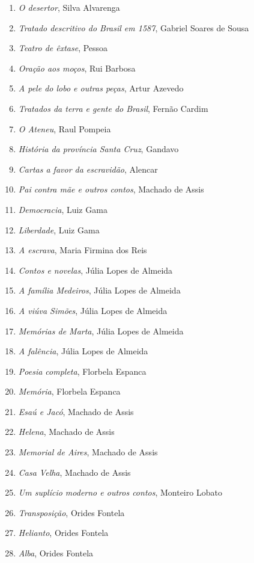 \begin{enumerate}
\setlength\parskip{4.2pt}
\setlength\itemsep{-1.4mm}
\item \textit{O desertor}, Silva Alvarenga
\item \textit{Tratado descritivo do Brasil em 1587}, Gabriel Soares de Sousa
\item \textit{Teatro de êxtase}, Pessoa
\item \textit{Oração aos moços}, Rui Barbosa
\item \textit{A pele do lobo e outras peças}, Artur Azevedo
\item \textit{Tratados da terra e gente do Brasil}, Fernão Cardim 
\item \textit{O Ateneu}, Raul Pompeia
\item \textit{História da província Santa Cruz}, Gandavo
\item \textit{Cartas a favor da escravidão}, Alencar
\item \textit{Pai contra mãe e outros contos}, Machado de Assis
\item \textit{Democracia}, Luiz Gama
\item \textit{Liberdade}, Luiz Gama
\item \textit{A escrava}, Maria Firmina dos Reis
\item \textit{Contos e novelas}, Júlia Lopes de Almeida 
\item \textit{A família Medeiros}, Júlia Lopes de Almeida
\item \textit{A viúva Simões}, Júlia Lopes de Almeida
\item \textit{Memórias de Marta}, Júlia Lopes de Almeida
\item \textit{A falência}, Júlia Lopes de Almeida
\item \textit{Poesia completa}, Florbela Espanca
\item \textit{Memória}, Florbela Espanca
\item \textit{Esaú e Jacó}, Machado de Assis
\item \textit{Helena}, Machado de Assis
\item \textit{Memorial de Aires}, Machado de Assis
\item \textit{Casa Velha}, Machado de Assis
\item \textit{Um suplício moderno e outros contos}, Monteiro Lobato
\item \textit{Transposição}, Orides Fontela
\item \textit{Helianto}, Orides Fontela
\item \textit{Alba}, Orides Fontela

\end{enumerate}
